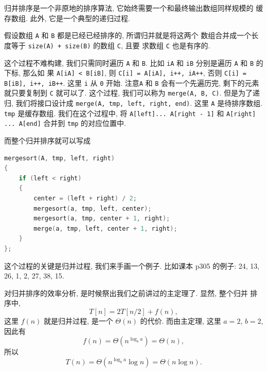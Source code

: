 \documentclass[a4paper]{ctexart}
\theoremstyle{definition}
\theoremstyle{definition}
\begin{document}

归并排序是一个非原地的排序算法, 它始终需要一个和最终输出数组同样规模的
缓存数组. 此外, 它是一个典型的递归过程.

假设数组 \verb|A| 和 \verb|B| 都是已经已经排序的, 所谓归并就是将这两个
数组合并成一个长度等于 \verb|size(A) + size(B)| 的数组 \verb|C|, 且要
求数组 \verb|C| 也是有序的.

这个过程不难构建, 我们只需同时遍历 \verb|A| 和 \verb|B|. 比如
\verb|iA| 和 \verb|iB| 分别是遍历 \verb|A| 和 \verb|B| 的下标, 那么如
果 \verb|A[iA] < B[iB]|, 则\newline
\verb|C[i] = A[iA], i++, iA++|, \newline
否则 \newline
\verb|C[i] = B[iB], i++, iB++|. \newline
这里 \verb|i| 从 \verb|0| 开始. 注意\verb|A| 和 \verb|B| 会有一个先遍历完,
剩下的元素就只要复制到 \verb|C| 就可以了. 这个过程, 我们可以称为\newline
\verb|merge(A, B, C)|. \newline
但是为了递归, 我们将接口设计成\newline
\verb|merge(A, tmp, left, right, end)|. \newline
这里 \verb|A| 是待排序数组. \verb|tmp| 是缓存数组. 我们在这个过程中, 将\newline
\verb|A[left]... A[right - 1]| \newline
和
\newline \verb|A[right] ... A[end]| \newline
合并到 \verb|tmp| 的对应位置中.

而整个归并排序就可以写成

\begin{lstlisting}[language=C++]
mergesort(A, tmp, left, right)
{
	if (left < right)
	{
		center = (left + right) / 2;
		mergesort(a, tmp, left, center);
		mergesort(a, tmp, center + 1, right);
		merge(a, tmp, left, center + 1, right);
	}
};
\end{lstlisting}

这个过程的关键是归并过程, 我们来手画一个例子. 比如课本 p305 的例子:
24, 13, 26, 1, 2, 27, 38, 15.

对归并排序的效率分析, 是时候祭出我们之前讲过的主定理了. 显然, 整个归并
排序中,
$$
T[n] = 2 T[n / 2] + f(n),
$$
这里 $f(n)$ 就是归并过程, 是一个 $\Theta(n)$ 的代价. 而由主定理, 这里
$a = 2$, $b = 2$, 因此有
$$
f(n) = \Theta(n^{\log_ba}) = \Theta(n),
$$
所以
$$
T(n) = \Theta(n^{\log_ba}\log n) = \Theta(n \log n).
$$
\end{document}

